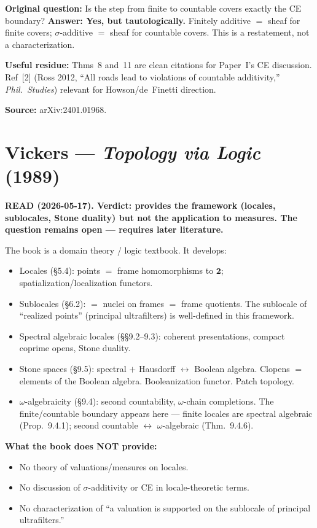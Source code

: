 \medskip\noindent
\textbf{Original question:} Is the step from finite to countable
covers exactly the CE boundary?  \textbf{Answer: Yes, but
tautologically.}  Finitely additive $=$ sheaf for finite covers;
$\sigma$-additive $=$ sheaf for countable covers.  This is a
restatement, not a characterization.

\medskip\noindent
\textbf{Useful residue:} Thms~8 and~11 are clean citations for
Paper~I's CE discussion.  Ref~[2] (Ross 2012, ``All roads lead to
violations of countable additivity,'' \emph{Phil.\ Studies})
relevant for Howson/de~Finetti direction.

\medskip\noindent
\textbf{Source:} arXiv:2401.01968.

\section{Vickers --- \emph{Topology via Logic} (1989)}

\textbf{READ (2026-05-17).  Verdict: provides the framework
(locales, sublocales, Stone duality) but not the application to
measures.  The question remains open --- requires later literature.}

\medskip\noindent
The book is a domain theory / logic textbook.  It develops:
\begin{itemize}[nosep]
  \item Locales (\S 5.4): points $=$ frame homomorphisms to
    $\mathbf{2}$; spatialization/localization functors.
  \item Sublocales (\S 6.2): $=$ nuclei on frames $=$ frame
    quotients.  The sublocale of ``realized points'' (principal
    ultrafilters) is well-defined in this framework.
  \item Spectral algebraic locales (\S\S 9.2--9.3): coherent
    presentations, compact coprime opens, Stone duality.
  \item Stone spaces (\S 9.5): spectral $+$ Hausdorff
    $\leftrightarrow$ Boolean algebra.  Clopens $=$ elements of the
    Boolean algebra.  Booleanization functor.  Patch topology.
  \item $\omega$-algebraicity (\S 9.4): second countability,
    $\omega$-chain completions.  The finite/countable boundary
    appears here --- finite locales are spectral algebraic
    (Prop.~9.4.1); second countable $\leftrightarrow$
    $\omega$-algebraic (Thm.~9.4.6).
\end{itemize}

\medskip\noindent
\textbf{What the book does NOT provide:}
\begin{itemize}[nosep]
  \item No theory of valuations/measures on locales.
  \item No discussion of $\sigma$-additivity or CE in
    locale-theoretic terms.
  \item No characterization of ``a valuation is supported on the
    sublocale of principal ultrafilters.''
\end{itemize}

